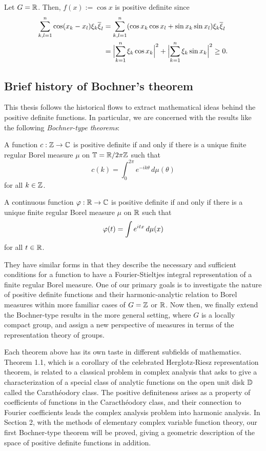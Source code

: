 \documentclass[10pt]{article}
\begin{document}
\begin{ex}
Let $G=\R$.
Then, $f(x):=\cos x$ is positive definite since
\begin{align*}
\sum_{k,l=1}^n\cos(x_k-x_l)\xi_k\bar\xi_l
&=\sum_{k,l=1}^n(\cos x_k\cos x_l+\sin x_k\sin x_l)\xi_k\bar\xi_l\\
&=\Bigl|\sum_{k=1}^n\xi_k\cos x_k\Bigr|^2+\Bigl|\sum_{k=1}^n\xi_k\sin x_k\Bigr|^2\ge0.
\end{align*}
\end{ex}


\subsection{Brief history of Bochner's theorem}

This thesis follows the historical flows to extract mathematical ideas behind the positive definite functions.
In particular, we are concerned with the results like the following \emph{Bochner-type theorems}:
\begin{thm}
A function $c:\Z\to\C$ is positive definite if and only if there is a unique finite regular Borel measure $\mu$ on $\T=\R/2\pi\Z$ such that
\[c(k)=\int_0^{2\pi}e^{-ik\theta}\,d\mu(\theta)\]
for all $k\in\Z$.
\end{thm}
\begin{thm}
A continuous function $\f:\R\to\C$ is positive definite if and only if there is a unique finite regular Borel measure $\mu$ on $\R$ such that
\[\f(t)=\int e^{itx}\,d\mu(x)\]
for all $t\in\R$.
\end{thm}
They have similar forms in that they describe the necessary and sufficient conditions for a function to have a Fourier-Stieltjes integral representation of a finite regular Borel measure.
One of our primary goals is to investigate the nature of positive definite functions and their harmonic-analytic relation to Borel measures within more familiar cases of $G=\Z$ or $\R$.
Now then, we finally extend the Bochner-type results in the more general setting, where $G$ is a locally compact group, and assign a new perspective of measures in terms of the representation theory of groups.

Each theorem above has its own taste in different subfields of mathematics.
Theorem 1.1, which is a corollary of the celebrated Herglotz-Riesz representation theorem, is related to a classical problem in complex analysis that asks to give a characterization of a special class of analytic functions on the open unit disk $\D$ called the Carath\'eodory class.
The positive definiteness arises as a property of coefficients of functions in the Caracth\'eodory class, and their connection to Fourier coefficients leads the complex analysis problem into harmonic analysis.
In Section 2, with the methods of elementary complex variable function theory, our first Bochner-type theorem will be proved, giving a geometric description of the space of positive definite functions in addition.
\end{document}
